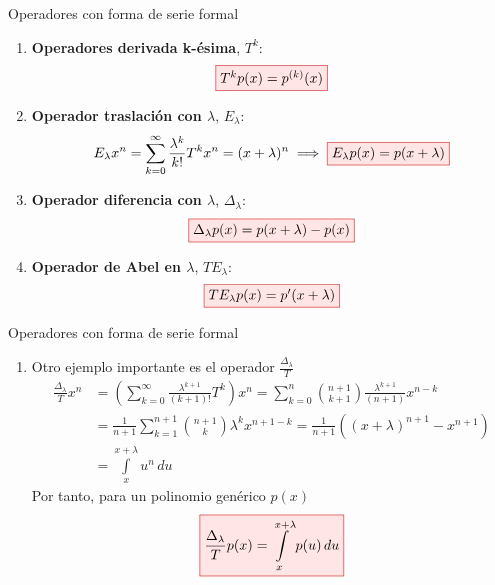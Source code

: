 \documentclass{beamer}
\newcommand{\rboxed}[1]{%
  \fcolorbox{red!80!black}{red!10}{$#1$}%
}
\begin{document}
\begin{frame}{Operadores con forma de serie formal}
  \begin{enumerate}
      \item \textbf{Operadores derivada k-ésima}, $T^k$:
        \begin{equation*}
          \rboxed{T^k p(x) = p^{(k)}(x)}        
        \end{equation*}
      \item \textbf{Operador traslación con $\lambda$}, $E_{\lambda}$:
        \begin{equation*}
            E_{\lambda} x^n = \sum_{k=0}^\infty \frac{\lambda^k}{k!} T^kx^n = (x+ \lambda )^n \implies \rboxed{E_{\lambda} p(x) = p(x+\lambda)}
        \end{equation*} 
      \item \textbf{Operador diferencia con $\lambda$}, $\Delta_{\lambda}$:
      \begin{equation*}
        \rboxed{\Delta_{\lambda} p(x) = p(x+ \lambda) - p(x)}
      \end{equation*}
      \item \textbf{Operador de Abel en $\lambda$}, $TE_{\lambda}$:
      \begin{equation*}
        \rboxed{TE_{\lambda}p(x) = p'(x+ \lambda)}
      \end{equation*}
    \end{enumerate}
\end{frame}

\begin{frame}{Operadores con forma de serie formal}
  \begin{enumerate}[5]
    \item Otro ejemplo importante es el operador $\frac{\Delta_{\lambda}}{T}$
      \begin{align*}
          \frac{\Delta_{\lambda}}{T}x^n & = \left(\sum_{k=0}^\infty \frac{\lambda^{k+1}}{(k+1)!}T^k\right) x^n = \sum_{k=0}^n \binom{n+1}{k+1} \frac{\lambda^{k+1}}{(n+1)}x^{n-k}\\
          & = \frac{1}{n+1}\sum_{k=1}^{n+1} \binom{n+1}{k} \lambda^k x^{n+1-k} = \frac{1}{n+1}((x+ \lambda )^{n+1} - x^{n+1})\\ 
          & = \int\limits_{x}^{x+ \lambda} u^n \, du
      \end{align*}
        Por tanto, para un polinomio genérico $p(x)$
        \begin{equation*}
          \rboxed{\displaystyle \frac{\Delta_{\lambda}}{T}p(x) = \int\limits_{x}^{x+ \lambda} p(u) \, du}
        \end{equation*}
  \end{enumerate}
\end{frame}
\end{document}
